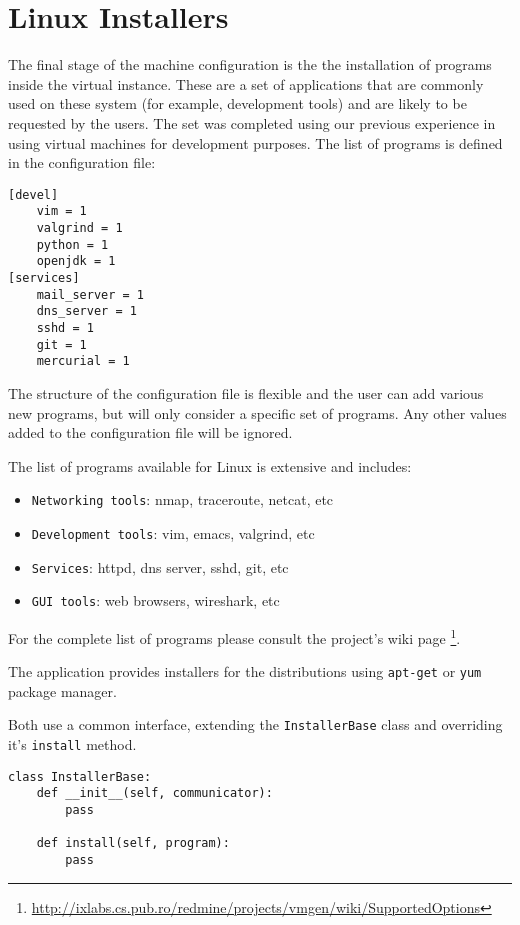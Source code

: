 \chapter{Linux Installers} \label{chapter:linux-inst}

The final stage of the machine configuration is the the installation 
of programs inside the virtual instance. These are a set of applications 
that are commonly used on these system (for example, development 
tools) and are likely to be requested by the users. The set was 
completed using our previous experience in using virtual machines 
for development purposes. The list of programs is defined in 
the configuration file:
\\
\lstset{language=Python,caption=User defined list of pograms,
label=lst:app-list}
\begin{lstlisting}
[devel]
	vim = 1
	valgrind = 1
	python = 1
	openjdk = 1
[services]
	mail_server = 1
	dns_server = 1
	sshd = 1
	git = 1
	mercurial = 1
\end{lstlisting}

The structure of the configuration file is flexible and the user can add 
various new programs, but \texttt{\project} will only consider a specific 
set of programs. Any other values added to the configuration file will 
be ignored.

The list of programs available for Linux is extensive and includes:
\begin{itemize}
  \item \texttt{Networking tools}: nmap, traceroute, netcat, etc
  \item \texttt{Development tools}: vim, emacs, valgrind, etc
  \item \texttt{Services}: httpd, dns server, sshd, git, etc
  \item \texttt{GUI tools}: web browsers, wireshark, etc
\end{itemize}

For the complete list of programs please consult the project's wiki page
\footnote{\url{http://ixlabs.cs.pub.ro/redmine/projects/vmgen/wiki/SupportedOptions}}.

The application provides installers for the distributions using \texttt{apt-get} or 
\texttt{yum} package manager.
\\

Both use a common interface, extending the \texttt{InstallerBase} class and 
overriding it's \texttt{install} method.
\\
\lstset{language=Python,caption=Common installer interface,
label=lst:if-installer}
\begin{lstlisting}
class InstallerBase:
	def __init__(self, communicator):
		pass

	def install(self, program):
		pass
\end{lstlisting}

